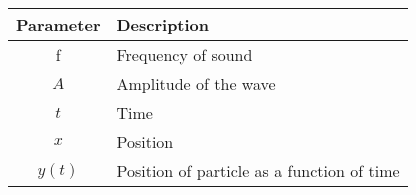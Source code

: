 \renewcommand{\arraystretch}{2}
\begin{tabular}{|c|p{2cm}|}
\hline 
\textbf{Parameter}  &\textbf{Description}  \\
\hline
f & Frequency of sound   \\
\hline
$A$ & Amplitude of the wave   \\
\hline
$t$ & Time \\
\hline
$x$ & Position  \\
\hline
$y(t)$ & Position of particle as a function of time\\
\hline
\end{tabular}
